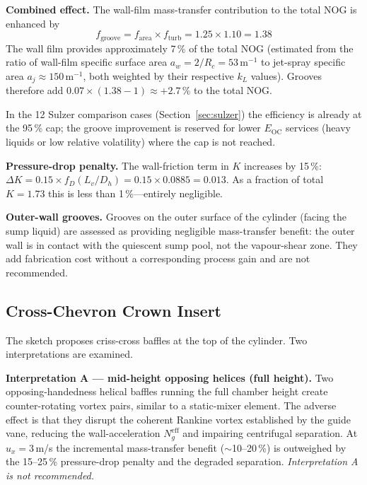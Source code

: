 \documentclass[11pt,letterpaper]{article}
\newcommand{\Rc}{R_c}
\begin{document}
\textbf{Combined effect.}  The wall-film mass-transfer contribution to the
total NOG is enhanced by
\begin{equation}
  f_{\mathrm{groove}} = f_{\mathrm{area}} \times f_{\mathrm{turb}}
                       = 1.25 \times 1.10 = 1.38
  \label{eq:f_groove}
\end{equation}
The wall film provides approximately 7\,\% of the total NOG (estimated from
the ratio of wall-film specific surface area $a_w = 2/\Rc = 53$\,m$^{-1}$
to jet-spray specific area $a_j \approx 150$\,m$^{-1}$, both weighted by their
respective $k_L$ values).  Grooves therefore add
$0.07 \times (1.38 - 1) \approx +2.7$\,\% to the total NOG.

In the 12 Sulzer comparison cases (Section~\ref{sec:sulzer}) the efficiency
is already at the 95\,\% cap; the groove improvement is reserved for lower
$E_{\mathrm{OC}}$ services (heavy liquids or low relative volatility) where the
cap is not reached.

\textbf{Pressure-drop penalty.}  The wall-friction term in $K$ increases by
15\,\%: $\Delta K = 0.15 \times f_D(L_v/D_h) = 0.15 \times 0.0885 = 0.013$.
As a fraction of total $K = 1.73$ this is less than 1\,\%---entirely
negligible.

\textbf{Outer-wall grooves.}  Grooves on the outer surface of the cylinder
(facing the sump liquid) are assessed as providing negligible mass-transfer
benefit: the outer wall is in contact with the quiescent sump pool, not the
vapour-shear zone.  They add fabrication cost without a corresponding
process gain and are not recommended.

\subsection{Cross-Chevron Crown Insert}

The sketch proposes criss-cross baffles at the top of the cylinder.  Two
interpretations are examined.

\textbf{Interpretation A — mid-height opposing helices (full height).}
Two opposing-handedness helical baffles running the full chamber height
create counter-rotating vortex pairs, similar to a static-mixer element.
The adverse effect is that they disrupt the coherent Rankine vortex
established by the guide vane, reducing the wall-acceleration
$N_g^{\mathrm{eff}}$ and impairing centrifugal separation.  At
$u_x = 3$\,m/s the incremental mass-transfer benefit ($\sim$10--20\,\%)
is outweighed by the 15--25\,\% pressure-drop penalty and the degraded
separation.  \emph{Interpretation A is not recommended.}
\end{document}
